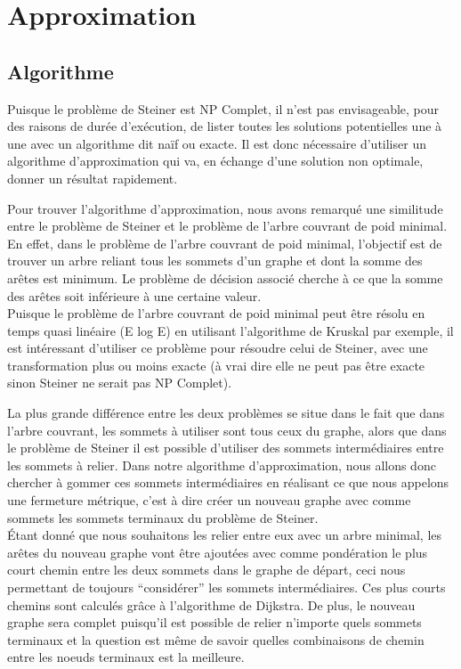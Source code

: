 \documentclass{article}
\begin{document}
\section{Approximation}

\subsection{Algorithme}
Puisque le problème de Steiner est NP Complet, il n'est pas envisageable, pour des raisons de durée d'exécution, de lister toutes les solutions potentielles une à une avec un algorithme dit naïf ou exacte. Il est donc nécessaire d'utiliser un algorithme d'approximation qui va, en échange d'une solution non optimale, donner un résultat rapidement. \\ \par

Pour trouver l'algorithme d'approximation, nous avons remarqué une similitude entre le problème de Steiner et le problème de l'arbre couvrant de poid minimal. En effet,  dans le problème de l'arbre couvrant de poid minimal, l'objectif est de trouver un arbre reliant tous les sommets d'un graphe et dont la somme des arêtes est minimum. Le problème de décision associé cherche à ce que la somme des arêtes soit inférieure à une certaine valeur. \\ 
Puisque le problème de l'arbre couvrant de poid minimal peut être résolu en temps quasi linéaire (E log E) en utilisant l'algorithme de Kruskal par exemple, il est intéressant d'utiliser ce problème pour résoudre celui de Steiner, avec une transformation plus ou moins exacte (à vrai dire elle ne peut pas être exacte sinon Steiner ne serait pas NP Complet). \\ \par

La plus grande différence entre les deux problèmes se situe dans le fait que dans l'arbre couvrant, les sommets à utiliser sont tous ceux du graphe, alors que dans le problème de Steiner il est possible d'utiliser des sommets intermédiaires entre les sommets à relier. Dans notre algorithme d'approximation, nous allons donc chercher à gommer ces sommets intermédiaires en réalisant ce que nous appelons une fermeture métrique, c'est à dire créer un nouveau graphe avec comme sommets les sommets terminaux du problème de Steiner. \\
Étant donné que nous souhaitons les relier entre eux avec un arbre minimal, les arêtes du nouveau graphe vont être ajoutées avec comme pondération le plus court chemin entre les deux sommets dans le graphe de départ, ceci nous permettant de toujours ``considérer'' les sommets intermédiaires. Ces plus courts chemins sont calculés grâce à l'algorithme de Dijkstra. De plus, le nouveau graphe sera complet puisqu'il est possible de relier n'importe quels sommets terminaux et la question est même de savoir quelles combinaisons de chemin entre les noeuds terminaux est la meilleure.\\ \par
 
\end{document}
